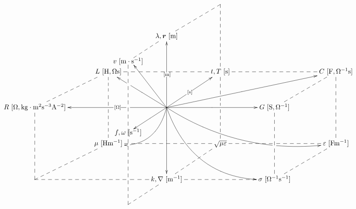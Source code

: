 \documentclass[a4j,10pt]{jarticle}
\makeatletter
\def\uni#1{[\unit{#1}]}
\def\cell#1#2{#1\,\uni{#2}}
\def\dotted#1{\ar@{--}[#1]}
\def\r{\bm r}
\makeatother
\begin{document}
\def\cell#1#2{#1\,\unit{[#2]}}
\def\uni#1{}
\vspace{-10mm}
\def\tom{\ar@{->}[uu]|-{\unit{[m]}}}
\def\tos{\ar@{->}[ur]|-{\unit{[s]}}}
\def\toO{\ar@{->}[ll]|!{[]+(-20,-13);[]+(-20,13)}\hole|-{\unit{[O]}}}
\def\tomm{\ar[dd]|-{\uni{m^{-1}}}}
\def\toms{\ar@{->}+(-20,-13)*{\cell{f,\omega}{s^{-1}}}|-{\uni{s^{-1}}}}
\def\tomO{\ar[rr]|-{\uni{O^{-1}}}}
\def\arrr{\dotted{rr}}
\def\ardd{\dotted{dd}}
\def\arddsplit{\dotted{dd}|!{[ld];[rr]}\hole|!{[ld];[rd]}\hole}
\def\aruu{\dotted{uu}}
\def\arll{\dotted{ll}}
\def\arllsplit{\dotted{ll}|!{[ld];[lu]}\hole}
\def\arllsplitp{\dotted{ll}|!{[]+(-20,-13);[]+(-20,13)}\hole}
\def\arrrsplit{\dotted{rr}|!{[rd];[ru]+(-20,-13)}\hole|!{[rd];[ru]}\hole}
\def\ard{\dotted{d}}
\def\arur{\dotted{ur}}
\def\ardr{\dotted{dr}}
\def\ardl{\dotted{dl}}
\def\arrowzp{\ar@/^2pc/[dl]|-(0.4){\uni{Hm^{-1}}}|!{[]+(-20,-13);[]+(-20,13)}\hole}
\def\arrowzzp{\ar@/_2pc/[rrrd]|-(0.25){\uni{Fm^{-1}}}|!{[rr];[rrdd]}\hole }
\def\tolv{\ar@{--}'+(-20,-13)*{\cell{v}{m\cdot s^{-1}}}'[dd]+(-20,-13)}
\def\tov{\ar@{->}[uu]+(-20,-13)+(3,-2)}
\def\toL{\ar@{->}[ul]|-{\uni{H,Os}}|!{+(-20,-12);+(-20,12)}\hole}
\def\toC{\ar@{->}[urrr]|-{\uni{F,O^{-1}s}}}
\def\arrowyyp{\ar@/_3pc/@{->}[rrdd]|-(0.7){\uni{O^{-1}m^{-1}}}}
\def\tof{\ar@{--}'+(-20,-13)'[uu]+(-20,-13)}
\def\toT{\ar@{--}'[ur]'[dr]}
\[\xymatrix@=0.50in{
  &&*=0{}& *=0{} &\\
      &      & \cell{\lambda,\r}{m} \tolv \toT &      &      &      & \\
      &      \cell{L}{H,Os} \arrrsplit\arddsplit      &      & \cell{t,T}{s}\arrr\arddsplit      &      & \cell{C}{F,O^{-1}s} \ardd      &      \\
 \cell{R}{O,kg\cdot m^2 s^{-3} A^{-2}}\ardd\arur      &      & *=0{}\arrowyyp\toL\toC\tov\tom\tos\toO\tomO\tomm\toms \arrowzzp \arrowzp      &      & \cell{G}{S,\Omega^{-1}}\arur\ardd      &      & \\
      &      \cell{\mu}{Hm^{-1}}      &      & \sqrt{\mu\varepsilon}\ardl\arll      &      & \cell{\varepsilon}{Fm^{-1}} \arllsplit      &      \\
 *=0{} \arur      &      & \cell{k,\nabla}{m^{-1}} \arllsplitp\tof      &      & \cell{\sigma}{O^{-1}s^{-1}}\arll\arur      &      & \\
 }\]
\end{document}
